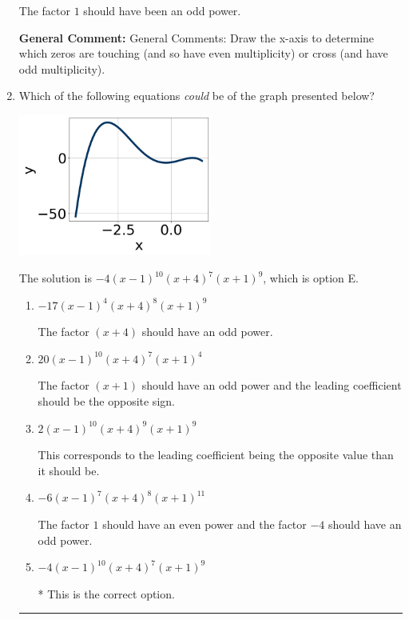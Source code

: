 \documentclass{extbook}[14pt]
\newcommand{\litem}[1]{\item #1

\rule{\textwidth}{0.4pt}}
\begin{document}
\begin{enumerate}
{\begin{enumerate}[label=\Alph*.]
The factor $1$ should have been an odd power.
\end{enumerate}

\textbf{General Comment:} General Comments: Draw the x-axis to determine which zeros are touching (and so have even multiplicity) or cross (and have odd multiplicity).
}
\litem{
Which of the following equations \textit{could} be of the graph presented below?

\begin{center}
    \includegraphics[width=0.5\textwidth]{../Figures/polyGraphToFunctionCopyB.png}
\end{center}


The solution is \( -4(x - 1)^{10} (x + 4)^{7} (x + 1)^{9} \), which is option E.\begin{enumerate}[label=\Alph*.]
\item \( -17(x - 1)^{4} (x + 4)^{8} (x + 1)^{9} \)

The factor $(x + 4)$ should have an odd power.
\item \( 20(x - 1)^{10} (x + 4)^{7} (x + 1)^{4} \)

The factor $(x + 1)$ should have an odd power and the leading coefficient should be the opposite sign.
\item \( 2(x - 1)^{10} (x + 4)^{9} (x + 1)^{9} \)

This corresponds to the leading coefficient being the opposite value than it should be.
\item \( -6(x - 1)^{7} (x + 4)^{8} (x + 1)^{11} \)

The factor $1$ should have an even power and the factor $-4$ should have an odd power.
\item \( -4(x - 1)^{10} (x + 4)^{7} (x + 1)^{9} \)

* This is the correct option.
\end{enumerate}

}
\end{enumerate}
\end{document}

